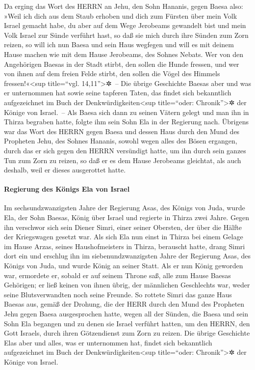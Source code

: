 Da erging das Wort des HERRN an Jehu, den Sohn Hananis,
gegen Baesa also: »Weil ich dich aus dem Staub erhoben und
dich zum Fürsten über mein Volk Israel gemacht habe, du aber auf dem
Wege Jerobeams gewandelt bist und mein Volk Israel zur Sünde verführt
hast, so daß sie mich durch ihre Sünden zum Zorn reizen,
so will ich nun Baesa und sein Haus wegfegen und will es
mit deinem Hause machen wie mit dem Hause Jerobeams, des Sohnes Nebats.
Wer von den Angehörigen Baesas in der Stadt stirbt, den
sollen die Hunde fressen, und wer von ihnen auf dem freien Felde stirbt,
den sollen die Vögel des Himmels fressen!«\textless sup title=``vgl.
14,11''\textgreater✲~-- Die übrige Geschichte Baesas aber
und was er unternommen hat sowie seine tapferen Taten, das findet sich
bekanntlich aufgezeichnet im Buch der Denkwürdigkeiten\textless sup
title=``oder: Chronik''\textgreater✲ der Könige von Israel.~--
Als Baesa sich dann zu seinen Vätern gelegt und man ihn in
Thirza begraben hatte, folgte ihm sein Sohn Ela in der Regierung nach.
Übrigens war das Wort des HERRN gegen Baesa und dessen
Haus durch den Mund des Propheten Jehu, des Sohnes Hananis, sowohl wegen
alles des Bösen ergangen, durch das er sich gegen den HERRN versündigt
hatte, um ihn durch sein ganzes Tun zum Zorn zu reizen, so daß er es dem
Hause Jerobeams gleichtat, als auch deshalb, weil er dieses ausgerottet
hatte.

\hypertarget{regierung-des-kuxf6nigs-ela-von-israel}{%
\paragraph{Regierung des Königs Ela von
Israel}\label{regierung-des-kuxf6nigs-ela-von-israel}}

Im sechsundzwanzigsten Jahre der Regierung Asas, des
Königs von Juda, wurde Ela, der Sohn Baesas, König über Israel und
regierte in Thirza zwei Jahre. Gegen ihn verschwor sich
sein Diener Simri, einer seiner Obersten, der über die Hälfte der
Kriegswagen gesetzt war. Als sich Ela nun einst in Thirza bei einem
Gelage im Hause Arzas, seines Haushofmeisters in Thirza, berauscht
hatte, drang Simri dort ein und erschlug ihn im
siebenundzwanzigsten Jahre der Regierung Asas, des Königs von Juda, und
wurde König an seiner Statt. Als er nun König geworden
war, ermordete er, sobald er auf seinem Throne saß, alle zum Hause
Baesas Gehörigen; er ließ keinen von ihnen übrig, der männlichen
Geschlechts war, weder seine Blutsverwandten noch seine Freunde.
So rottete Simri das ganze Haus Baesas aus, gemäß der
Drohung, die der HERR durch den Mund des Propheten Jehu gegen Baesa
ausgesprochen hatte, wegen all der Sünden, die Baesa und
sein Sohn Ela begangen und zu denen sie Israel verführt hatten, um den
HERRN, den Gott Israels, durch ihren Götzendienst zum Zorn zu reizen.
Die übrige Geschichte Elas aber und alles, was er
unternommen hat, findet sich bekanntlich aufgezeichnet im Buch der
Denkwürdigkeiten\textless sup title=``oder: Chronik''\textgreater✲ der
Könige von Israel.

